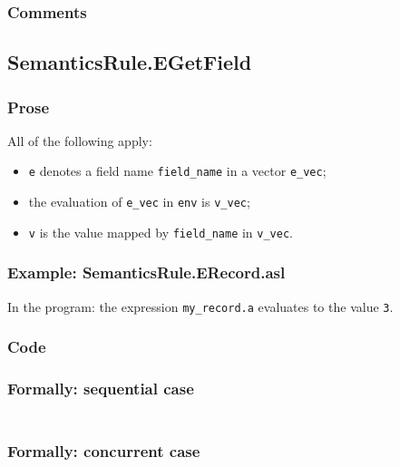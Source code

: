 \documentclass{book}
\begin{document}
  \subsubsection{Comments}

\subsection{SemanticsRule.EGetField \label{sec:SemanticsRule.EGetField}}

  \subsubsection{Prose}
  All of the following apply:
  \begin{itemize}
  \item \texttt{e} denotes a field name \texttt{field\_name} in a vector \texttt{e\_vec};
  \item the evaluation of \texttt{e\_vec} in \texttt{env} is \texttt{v\_vec};
  \item \texttt{v} is the value mapped by \texttt{field\_name} in \texttt{v\_vec}.
  \end{itemize}

  \subsubsection{Example: SemanticsRule.ERecord.asl}
    In the program:
    the expression \texttt{my\_record.a} evaluates to the value \texttt{3}.

  \subsubsection{Code}

  \subsubsection{Formally: sequential case}
  \begin{align}
  \end{align} 

  \subsubsection{Formally: concurrent case}
  \begin{align}
  \end{align} 
\end{document}
